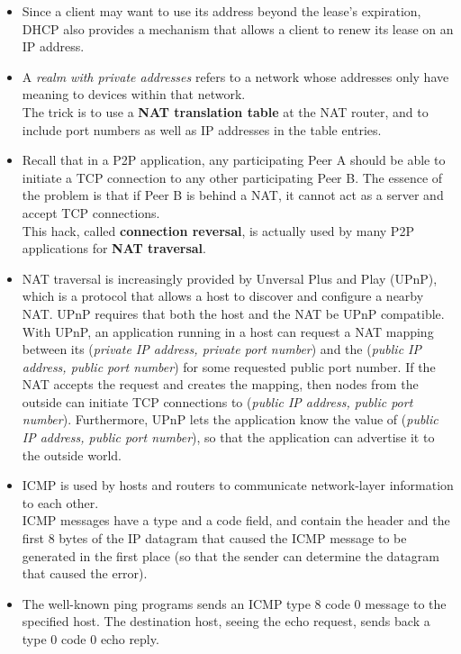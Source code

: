 \begin{itemize}
\item
Since a client may want to use its address beyond the lease's expiration, DHCP also provides a mechanism that allows a client to renew its lease on an IP address.

\item
A \textit{realm with private addresses} refers to a network whose addresses only have meaning to devices within that network.\\
The trick is to use a \textbf{NAT translation table} at the NAT router, and to include port numbers as well as IP addresses in the table entries.

\item
Recall that in a P2P application, any participating Peer A should be able to initiate a TCP connection to any other participating Peer B. The essence of the problem is that if Peer B is behind a NAT, it cannot act as a server and accept TCP connections.\\
This hack, called \textbf{connection reversal}, is actually used by many P2P applications for \textbf{NAT traversal}.

\item
NAT traversal is increasingly provided by Unversal Plus and Play (UPnP), which is a protocol that allows a host to discover and configure a nearby NAT. UPnP requires that both the host and the NAT be UPnP compatible. With UPnP, an application running in a host can request a NAT mapping between its (\textit{private IP address, private port number}) and the (\textit{public IP address, public port number}) for some requested public port number. If the NAT accepts the request and creates the mapping, then nodes from the outside can initiate TCP connections to (\textit{public IP address, public port number}). Furthermore, UPnP lets the application know the value of (\textit{public IP address, public port number}), so that the application can advertise it to the outside world.

\item
ICMP is used by hosts and routers to communicate network-layer information to each other.\\
ICMP messages have a type and a code field, and contain the header and the first 8 bytes of the IP datagram that caused the ICMP message to be generated in the first place (so that the sender can determine the datagram that caused the error).

\item
The well-known ping programs sends an ICMP type 8 code 0 message to the specified host. The destination host, seeing the echo request, sends back a type 0 code 0 echo reply.


\end{itemize}
